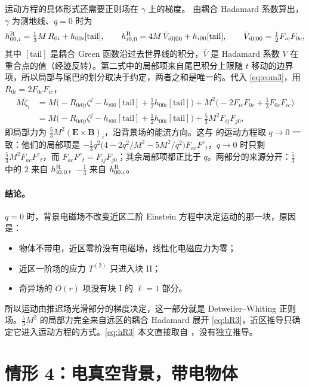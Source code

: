 \documentclass[11pt,a4paper]{ctexart}
\numberwithin{equation}{section}
\begin{document}
运动方程的具体形式还需要正则场在 $\gamma$ 上的梯度。\citet{ZimmermanPoisson2014} 由耦合 Hadamard 系数算出，$\gamma$ 为测地线、$q=0$ 时为
\begin{equation}
h^{\rm R}_{00,i}=\tfrac13M\,R_{0i}+h_{00i}[\text{tail}],\qquad
h^{\rm R}_{i0,0}=4M\,\bar V_{i0|00}+h_{i00}[\text{tail}],\qquad
\bar V_{i0|00}=\tfrac12F_{ic}F_{0c},
\label{eq:hR3}
\end{equation}
其中 $[\text{tail}]$ 是耦合 Green 函数沿过去世界线的积分，$\bar V$ 是 Hadamard 系数 $V$ 在重合点的值（经迹反转）。第二式中的局部项来自尾巴积分上限随 $t$ 移动的边界项，所以局部与尾巴的划分取决于约定，两者之和是唯一的。代入 \eqref{eq:eom3}，用 $R_{0i}=2F_{0c}F_{ic}$，
\begin{align}
M\ddot\zeta_i&=M\Big(-R_{0i0j}\zeta^j-h_{i00}[\text{tail}]+\tfrac12h_{00i}[\text{tail}]\Big)+M^2\Big(-2F_{ic}F_{0c}+\tfrac13F_{0c}F_{ic}\Big)\nonumber\\
&=M\Big(-R_{0i0j}\zeta^j-h_{i00}[\text{tail}]+\tfrac12h_{00i}[\text{tail}]\Big)+\tfrac53M^2F_{ij}F_{j0},
\label{eq:eom3ZP}
\end{align}
即局部力为 $\tfrac53M^2(\boldsymbol E\times\boldsymbol B)_i$，沿背景场的能流方向。这与 \citet{ZimmermanPoisson2014} 的运动方程取 $q\to0$ 一致：他们的局部项是 $-\tfrac13q^2\big(4-2q^2/M^2-5M^2/q^2\big)F_{ac}F^c{}_t$，$q\to0$ 时只剩 $\tfrac53M^2F_{ac}F^c{}_t$，而 $F_{ac}F^c{}_t=F_{ij}F_{j0}$；其余局部项都正比于 $q$。两部分的来源分开：$\tfrac53$ 中的 $2$ 来自 $h^{\rm R}_{i0,0}$，$-\tfrac13$ 来自 $h^{\rm R}_{00,i}$。

\paragraph{结论。}$q=0$ 时，背景电磁场不改变近区二阶 Einstein 方程中决定运动的那一块，原因是：
\begin{itemize}
\item 物体不带电，近区零阶没有电磁场，线性化电磁应力为零；
\item 近区一阶场的应力 $T^{(2)}$ 只进入块 II；
\item 奇异场的 $O(r)$ 项没有块 I 的 $\ell=1$ 部分。
\end{itemize}
所以运动由推迟场光滑部分的梯度决定，这一部分就是 Detweiler--Whiting 正则场。$\tfrac53M^2$ 的局部力完全来自远区的耦合 Hadamard 展开 \eqref{eq:hR3}，近区推导只确定它进入运动方程的方式。\eqref{eq:hR3} 本文直接取自 \citet{ZimmermanPoisson2014}，没有独立推导。


\section{情形 4：电真空背景，带电物体}
\label{sec:L4}
\end{document}
